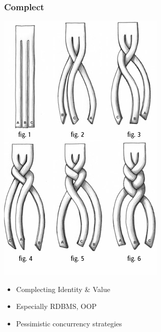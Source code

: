 \documentclass[11pt]{article}
\begin{document}
\subsubsection*{Complect}
\label{sec:orgheadline14}

\includegraphics[width=.9\linewidth]{./plaiting.jpg}

\begin{itemize}
\item Complecting Identity \& Value
\end{itemize}
\begin{itemize}
\item Especially RDBMS, OOP
\end{itemize}
\begin{itemize}
\item Pessimistic concurrency strategies
\end{itemize}
\end{document}
